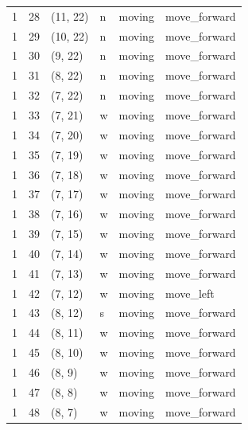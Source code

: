 \documentclass[12pt, a4paper]{llncs}
\begin{document}
\begin{table}[htbp]
\begin{tabular}{llllll}
1 & 28 & (11, 22) & n & moving & move\_forward \\
1 & 29 & (10, 22) & n & moving & move\_forward \\
1 & 30 & (9, 22)	 & n & moving & move\_forward \\
1 & 31 & (8, 22)	 & n & moving & move\_forward \\
1 & 32 & (7, 22)	 & n & moving & move\_forward \\
1 & 33 & (7, 21)	 & w & moving & move\_forward \\
1 & 34 & (7, 20)	 & w & moving & move\_forward \\
1 & 35 & (7, 19)	 & w & moving & move\_forward \\
1 & 36 & (7, 18)	 & w & moving & move\_forward \\
1 & 37 & (7, 17)	 & w & moving & move\_forward \\
1 & 38 & (7, 16)	 & w & moving & move\_forward \\
1 & 39 & (7, 15)	 & w & moving & move\_forward \\
1 & 40 & (7, 14)	 & w & moving & move\_forward \\
1 & 41 & (7, 13)	 & w & moving & move\_forward \\
1 & 42 & (7, 12)	 & w & moving & move\_left \\
1 & 43 & (8, 12)	 & s & moving & move\_forward \\
1 & 44 & (8, 11)	 & w & moving & move\_forward \\
1 & 45 & (8, 10)	 & w & moving & move\_forward \\
1 & 46 & (8, 9)	 & w & moving & move\_forward \\
1 & 47 & (8, 8)	 & w & moving & move\_forward \\
1 & 48 & (8, 7)	 & w & moving & move\_forward \\
    \bottomrule
  \end{tabular}
\end{table}
\end{document}
